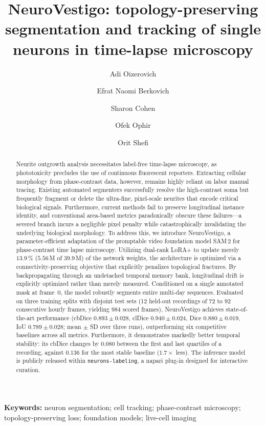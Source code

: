 \documentclass[11pt,a4paper]{article}
\title{\textbf{NeuroVestigo: topology-preserving segmentation and tracking
of single neurons in time-lapse microscopy}}
\author[1]{Adi Oizerovich}
\author[1]{Efrat Naomi Berkovich}
\author[1]{Sharon Cohen}
\author[1]{Ofek Ophir}
\author[1,*]{Orit Shefi}
\affil[1]{Faculty of Engineering, Bar-Ilan University, Ramat Gan, Israel}
\affil[*]{Correspondence: adi.oizerovich@gmail.com}
\date{}
\begin{document}
\maketitle

\begin{abstract}
\noindent
Neurite outgrowth analysis necessitates label-free time-lapse microscopy, as
phototoxicity precludes the use of continuous fluorescent reporters.
Extracting cellular morphology from phase-contrast data, however, remains
highly reliant on labor manual tracing. Existing automated
segmenters successfully resolve the high-contrast soma but frequently
fragment or delete the ultra-fine, pixel-scale neurites that encode critical
biological signals. Furthermore, current methods fail to preserve
longitudinal instance identity, and conventional area-based metrics
paradoxically obscure these failures---a severed branch incurs a negligible
pixel penalty while catastrophically invalidating the underlying biological
morphology. To address this, we introduce NeuroVestigo, a
parameter-efficient adaptation of the promptable video foundation model
SAM\,2 for phase-contrast time lapse microscopy. Utilizing
dual-rank LoRA+ to update merely $13.9\,\%$ ($5.56$\,M of $39.9$\,M) of the
network weights, the architecture is optimized via a connectivity-preserving
objective that explicitly penalizes topological fractures. By
backpropagating through an undetached temporal memory bank, longitudinal
drift is explicitly optimized rather than merely measured. Conditioned on a
single annotated mask at frame~0, the model robustly segments entire
multi-day sequences. Evaluated on three training splits with disjoint test
sets (12 held-out recordings of 72 to 92 consecutive hourly frames, yielding
$984$ scored frames), NeuroVestigo achieves state-of-the-art performance
(cbDice $0.893 \pm 0.028$, clDice $0.940 \pm 0.024$, Dice $0.880 \pm 0.019$,
IoU $0.789 \pm 0.028$; mean $\pm$ SD over three runs), outperforming six
competitive baselines across all metrics. Furthermore, it demonstrates
markedly better temporal stability: its cbDice changes by $0.080$ between the
first and last quartiles of a recording, against $0.136$ for the most stable
baseline ($1.7\times$ less).
The inference model is publicly released within \texttt{neurons-labeling}, a
napari plug-in designed for interactive curation.
\end{abstract}

\noindent\textbf{Keywords:} neuron segmentation; cell tracking;
phase-contrast microscopy; topology-preserving loss; foundation models;
live-cell imaging
\end{document}
